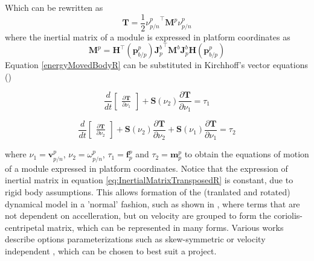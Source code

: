 Which can be rewritten as
\begin{equation}
	\textbf{T} = \frac{1}{2} {\nu_{p/n}^{p}}^{\top}\textbf{M}^{p} \nu_{p/n}^{p}
	\label{energyMovedBodyR}
\end{equation}
where the inertial matrix of a module is expressed in platform coordinates as
\begin{equation}
	\textbf{M}^{p} =  \textbf{H}^{\top}(\textbf{p}_{b/p}^{p}){\textbf{J}_{p}^{b}}^{\top}  \textbf{M}^{b} \textbf{J}_{p}^{b} \textbf{H}(\textbf{p}_{b/p}^{p})
	\label{eq:InertialMatrixTransposedR}
\end{equation}
Equation \ref{energyMovedBodyR} can be substituted in Kirchhoff's vector equations (\citet{kirchhoff1869bewegung})

\begin{equation} 
	\frac{d}{dt} \begin{bmatrix}\frac{\partial \textbf{T}}{\partial \nu_{1}}\end{bmatrix} + \textbf{S}(\nu_{2})\frac{\partial \textbf{T}}{\partial \nu_{1}} = \tau_{1}
\end{equation}

\begin{equation} 
	\frac{d}{dt} \begin{bmatrix}\frac{\partial \textbf{T}}{\partial \nu_{2}}\end{bmatrix} + \textbf{S}(\nu_{2})\frac{\partial \textbf{T}}{\partial \nu_{2}}+ \textbf{S}(\nu_{1})\frac{\partial \textbf{T}}{\partial \nu_{1}} = \tau_{2}
\end{equation}

where $\nu_{1} = \textbf{v}_{p/n}^{p}$, $\nu_{2} = \omega_{p/n}^{p}$, $\tau_{1} = \textbf{f}_{p}^{p}$ and  $\tau_{2} = \textbf{m}_{p}^{p}$ to obtain the equations of motion of a module expressed in platform coordinates. Notice that the expression of inertial matrix in equation \ref{eq:InertialMatrixTransposedR} is constant, due to rigid body assumptions. This allows formation of the (tranlated and rotated) dynamical model in a 'normal' fashion, such as shown in \citet{fossen2011handbook}, where terms that are not dependent on accelleration, but on velocity are grouped to form the coriolis-centripetal matrix, which can be represented in many forms. Various works describe options parameterizations such as skew-symmetric \citet{sagatun1991lagrangian} or velocity independent \citet{fossenFjellstad1995}, which can be chosen to best suit a project.

